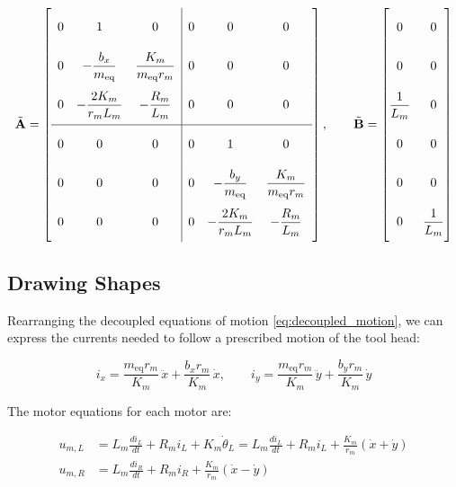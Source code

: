 \begin{equation*}
\tilde{\mathbf{A}} =
\left[\begin{array}{ccc|ccc}
\mstrut 0 & 1 & 0 & 0 & 0 & 0 \\
\mstrut 0 & -\dfrac{b_x}{m_{\mathrm{eq}}} & \dfrac{K_m}{m_{\mathrm{eq}} r_m} & 0 & 0 & 0 \\
\mstrut 0 & -\dfrac{2K_m}{r_m L_m} & -\dfrac{R_m}{L_m} & 0 & 0 & 0 \\ \hline
\mstrut 0 & 0 & 0 & 0 & 1 & 0 \\
\mstrut 0 & 0 & 0 & 0 & -\dfrac{b_y}{m_{\mathrm{eq}}} & \dfrac{K_m}{m_{\mathrm{eq}} r_m} \\
\mstrut 0 & 0 & 0 & 0 & -\dfrac{2K_m}{r_m L_m} & -\dfrac{R_m}{L_m}
\end{array}\right],
\qquad
\tilde{\mathbf{B}} =
\begin{bmatrix}
\mstrut 0 & 0 \\ \mstrut 0 & 0 \\ \mstrut \dfrac{1}{L_m} & 0 \\ \mstrut 0 & 0 \\ \mstrut 0 & 0 \\ \mstrut 0 & \dfrac{1}{L_m}
\end{bmatrix}
\end{equation*}

\subsection{Drawing Shapes}
\label{sec:drawing_shapes}

Rearranging the decoupled equations of motion \eqref{eq:decoupled_motion}, we can express the currents needed to follow a prescribed motion of the tool head:

\begin{equation}
\label{eq:inverse_currents}
\boxed{
i_x = \frac{m_{\mathrm{eq}} r_m}{K_m}\,\ddot x + \frac{b_x r_m}{K_m}\,\dot x, \qquad
i_y = \frac{m_{\mathrm{eq}} r_m}{K_m}\,\ddot y + \frac{b_y r_m}{K_m}\,\dot y}
\end{equation}

The motor equations for each motor are:

\begin{equation*}
\begin{aligned}
u_{m,L} &= L_m \frac{di_L}{dt} + R_m i_L + K_m \dot\theta_L
         = L_m \frac{di_L}{dt} + R_m i_L + \frac{K_m}{r_m}\left(\dot x + \dot y\right) \\
u_{m,R} &= L_m \frac{di_R}{dt} + R_m i_R + \frac{K_m}{r_m}\left(\dot x - \dot y\right)
\end{aligned}
\end{equation*}


